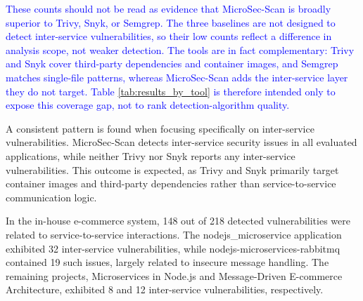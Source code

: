 \documentclass[preprint,12pt]{elsarticle}
\newcommand{\new}[1]{\textcolor{blue}{#1}}
\begin{document}
\new{These counts should not be read as evidence that MicroSec-Scan is broadly superior to Trivy, Snyk, or Semgrep. The three baselines are not designed to detect inter-service vulnerabilities, so their low counts reflect a difference in analysis scope, not weaker detection. The tools are in fact complementary: Trivy and Snyk cover third-party dependencies and container images, and Semgrep matches single-file patterns, whereas MicroSec-Scan adds the inter-service layer they do not target. Table \ref{tab:results_by_tool} is therefore intended only to expose this coverage gap, not to rank detection-algorithm quality.}


A consistent pattern is found when focusing specifically on inter-service vulnerabilities. MicroSec-Scan detects inter-service security issues in all evaluated applications, while neither Trivy nor Snyk reports any inter-service vulnerabilities. This outcome is expected, as Trivy and Snyk primarily target container images and third-party dependencies rather than service-to-service communication logic.

In the in-house e-commerce system, 148 out of 218 detected vulnerabilities were related to service-to-service interactions. The nodejs\_microservice application exhibited 32 inter-service vulnerabilities, while nodejs-microservices-rabbitmq contained 19 such issues, largely related to insecure message handling. The remaining projects, Microservices in Node.js and Message-Driven E-commerce Architecture, exhibited 8 and 12 inter-service vulnerabilities, respectively.
\end{document}
